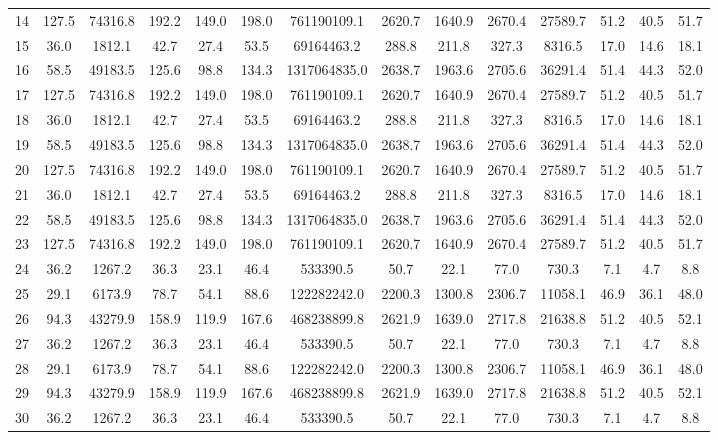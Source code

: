 \begin{table}[htbp]
\begin{tabular}{|c|c|c|c|c|c|c|c|c|c|c|c|c|c|}
14 & 127.5 & 74316.8 & 192.2 & 149.0 & 198.0 &  761190109.1 & 2620.7 & 1640.9 & 2670.4 & 27589.7 & 51.2 & 40.5 & 51.7 \\
15 &  36.0 &  1812.1 &  42.7 &  27.4 &  53.5 &   69164463.2 &  288.8 &  211.8 &  327.3 &  8316.5 & 17.0 & 14.6 & 18.1 \\
16 &  58.5 & 49183.5 & 125.6 &  98.8 & 134.3 & 1317064835.0 & 2638.7 & 1963.6 & 2705.6 & 36291.4 & 51.4 & 44.3 & 52.0 \\
17 & 127.5 & 74316.8 & 192.2 & 149.0 & 198.0 &  761190109.1 & 2620.7 & 1640.9 & 2670.4 & 27589.7 & 51.2 & 40.5 & 51.7 \\
18 &  36.0 &  1812.1 &  42.7 &  27.4 &  53.5 &   69164463.2 &  288.8 &  211.8 &  327.3 &  8316.5 & 17.0 & 14.6 & 18.1 \\
19 &  58.5 & 49183.5 & 125.6 &  98.8 & 134.3 & 1317064835.0 & 2638.7 & 1963.6 & 2705.6 & 36291.4 & 51.4 & 44.3 & 52.0 \\
20 & 127.5 & 74316.8 & 192.2 & 149.0 & 198.0 &  761190109.1 & 2620.7 & 1640.9 & 2670.4 & 27589.7 & 51.2 & 40.5 & 51.7 \\
21 &  36.0 &  1812.1 &  42.7 &  27.4 &  53.5 &   69164463.2 &  288.8 &  211.8 &  327.3 &  8316.5 & 17.0 & 14.6 & 18.1 \\
22 &  58.5 & 49183.5 & 125.6 &  98.8 & 134.3 & 1317064835.0 & 2638.7 & 1963.6 & 2705.6 & 36291.4 & 51.4 & 44.3 & 52.0 \\
23 & 127.5 & 74316.8 & 192.2 & 149.0 & 198.0 &  761190109.1 & 2620.7 & 1640.9 & 2670.4 & 27589.7 & 51.2 & 40.5 & 51.7 \\
24 &  36.2 &  1267.2 &  36.3 &  23.1 &  46.4 &     533390.5 &   50.7 &   22.1 &   77.0 &   730.3 &  7.1 &  4.7 &  8.8 \\
25 &  29.1 &  6173.9 &  78.7 &  54.1 &  88.6 &  122282242.0 & 2200.3 & 1300.8 & 2306.7 & 11058.1 & 46.9 & 36.1 & 48.0 \\
26 &  94.3 & 43279.9 & 158.9 & 119.9 & 167.6 &  468238899.8 & 2621.9 & 1639.0 & 2717.8 & 21638.8 & 51.2 & 40.5 & 52.1 \\
27 &  36.2 &  1267.2 &  36.3 &  23.1 &  46.4 &     533390.5 &   50.7 &   22.1 &   77.0 &   730.3 &  7.1 &  4.7 &  8.8 \\
28 &  29.1 &  6173.9 &  78.7 &  54.1 &  88.6 &  122282242.0 & 2200.3 & 1300.8 & 2306.7 & 11058.1 & 46.9 & 36.1 & 48.0 \\
29 &  94.3 & 43279.9 & 158.9 & 119.9 & 167.6 &  468238899.8 & 2621.9 & 1639.0 & 2717.8 & 21638.8 & 51.2 & 40.5 & 52.1 \\
30 &  36.2 &  1267.2 &  36.3 &  23.1 &  46.4 &     533390.5 &   50.7 &   22.1 &   77.0 &   730.3 &  7.1 &  4.7 &  8.8 \\

\end{tabular}
\end{table}
